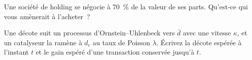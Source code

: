 \begin{interviewq}\label{iq:s1:share-classes-holding-companies-closed-end-funds-spacs:5}
Une société de holding se négocie à 70~\% de la valeur de ses parts. Qu'est-ce qui vous amènerait à l'acheter~?
\end{interviewq}

\begin{interviewq}\label{iq:s1:share-classes-holding-companies-closed-end-funds-spacs:6}
Une décote suit un processus d'Ornstein--Uhlenbeck vers $\bar d$ avec une vitesse $\kappa$, et un catalyseur la ramène à $d_c$ au taux de Poisson $\lambda$. Écrivez la
décote espérée à l'instant $t$ et le gain espéré d'une transaction conservée jusqu'à $t$.
\end{interviewq}
